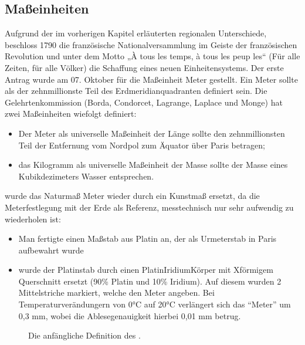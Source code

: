 \documentclass[letterpaper,10pt,english]{jupyterBook}
\let\sphinxpxdimen\pdfpxdimen\else\newdimen\sphinxpxdimen
\begin{document}
\subsection{Maßeinheiten}
\label{\detokenize{content/1_Messen_Einheit:maszeinheiten}}
\sphinxAtStartPar
Aufgrund der im vorherigen Kapitel erläuterten regionalen Unterschiede, beschloss 1790 die französische Nationalversammlung im Geiste der französischen Revolution und unter dem Motto „À tous les temps, à tous les peup\sphinxhyphen{} les“ (Für alle Zeiten, für alle Völker) die Schaffung eines neuen Einheitensystems.
Der erste Antrag wurde am 07. Oktober für die Maßeinheit Meter gestellt. Ein Meter sollte als der zehnmillionste Teil des Erdmeridianquadranten definiert sein. Die Gelehrtenkommission (Borda, Condorcet, Lagrange, Laplace und Monge) hat zwei Maßeinheiten wiefolgt definiert:
\begin{itemize}
\item {} 
\sphinxAtStartPar
Der Meter als universelle Maßeinheit der Länge sollte den zehnmillionsten Teil der Entfernung vom Nordpol zum Äquator über Paris betragen;

\item {} 
\sphinxAtStartPar
das Kilogramm als universelle Maßeinheit der Masse sollte der Masse eines Kubikdezimeters Wasser entsprechen.

\end{itemize}

 wurde das Naturmaß Meter wieder durch ein Kunstmaß ersetzt, da die Meterfestlegung mit der Erde als Referenz, messtechnisch nur sehr aufwendig zu wiederholen ist:
\begin{itemize}
\item {} 
\sphinxAtStartPar
Man fertigte einen Maßstab aus Platin an, der als Urmeterstab in Paris aufbewahrt wurde

\item {} 
 wurde der Platinstab durch einen Platin\sphinxhyphen{}Iridium\sphinxhyphen{}Körper mit X\sphinxhyphen{}förmigem Querschnitt ersetzt (90\% Platin und 10\% Iridium). Auf diesem wurden 2 Mittelstriche markiert, welche den Meter angeben. Bei Temperaturverändungern von 0°C auf 20°C verlängert sich das “Meter” um 0,3 mm,  wobei die Ablesegenauigkeit hierbei 0,01 mm betrug.

\end{itemize}

\begin{figure}[htbp]
\centering
\capstart

\noindent\sphinxincludegraphics[width=400\sphinxpxdimen]{{meter}.png}
\caption{Die anfängliche Definition des .}\label{\detokenize{content/1_Messen_Einheit:meter}}\end{figure}
\end{document}
